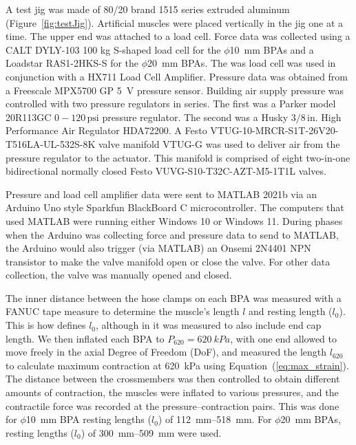 A test jig was made of 80/20 brand 1515 series extruded aluminum (Figure~\ref{fig:testJig}). Artificial muscles were placed vertically in the jig one at a time. The upper end was attached to a load cell.
Force data was collected using a CALT DYLY-103 100 kg S-shaped load cell for the $\phi$\qty{10}{\mm} BPAs and a Loadstar RAS1-2HKS-S for the $\phi$\qty{20}{\mm} BPAs. The was load cell was used in conjunction with a HX711 Load Cell Amplifier. Pressure data was obtained from a Freescale MPX5700 GP \qty{5}{\volt} pressure sensor. Building air supply pressure was controlled with two pressure regulators in series. The first was a Parker model 20R113GC $0-120\,\text{psi}$ pressure regulator. The second was a Husky $3/8\,\text{in.}$ High Performance Air Regulator HDA72200. A Festo VTUG-10-MRCR-S1T-26V20-T516LA-UL-532S-8K valve manifold VTUG-G was used to deliver air from the pressure regulator to the actuator. This manifold is comprised of eight two-in-one bidirectional normally closed Festo VUVG-S10-T32C-AZT-M5-1T1L valves. 

Pressure and load cell amplifier data were sent to MATLAB 2021b via an Arduino Uno style Sparkfun BlackBoard C microcontroller. The computers that used MATLAB were running either Windows 10 or Windows 11. During phases when the Arduino was collecting force and pressure data to send to MATLAB, the Arduino would also trigger (via MATLAB) an Onsemi 2N4401 NPN transistor to make the valve manifold open or close the valve. For other data collection, the valve was manually opened and closed. 

The inner distance between the hose clamps on each BPA was measured with a FANUC tape measure to determine the muscle's length $l$ and resting length ($l_0$). This is how \citet{festo_2026} defines $l_0$, although in \citet{hunt_modeling_2017} it was measured to also include end cap length. We then inflated each BPA to $P_{620}=\qty{620}{kPa}$, with one end allowed to move freely in the axial Degree of Freedom (DoF), and measured the length $l_{620}$ to calculate maximum contraction at \qty{620}{\kPa} using Equation~(\ref{eq:max_strain}). The distance between the crossmembers was then controlled to obtain different amounts of contraction, the muscles were inflated to various pressures, and the contractile force was recorded at the pressure--contraction pairs. This was done for $\phi$\qty{10}{\mm} BPA resting lengths ($l_0$) of \SIrange[range-phrase=--]{112}{518}{\mm}. For $\phi$\qty{20}{\mm} BPAs, resting lengths ($l_0$) of \SIrange[range-phrase=--]{300}{509}{\mm} were used.

